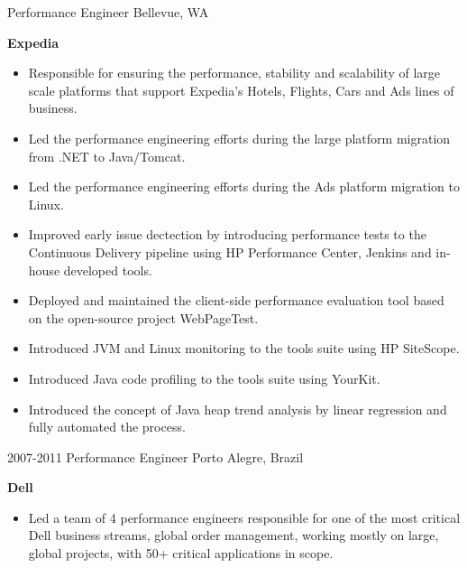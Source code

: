 \begin{entrylist}
    {Performance Engineer}
    {Bellevue, WA}
    {
      \textbf{Expedia}
      \begin{itemize}
        \item Responsible for ensuring the performance, stability and scalability of large scale platforms that support Expedia's Hotels, Flights, Cars and Ads lines of business.
        \item Led the performance engineering efforts during the large platform migration from .NET to Java/Tomcat.
        \item Led the performance engineering efforts during the Ads platform migration to Linux.
        \item Improved early issue dectection by introducing performance tests to the Continuous Delivery pipeline using HP Performance Center, Jenkins and in-house developed tools.
        \item Deployed and maintained the client-side performance evaluation tool based on the open-source project WebPageTest.
        \item Introduced JVM and Linux monitoring to the tools suite using HP SiteScope.
        \item Introduced Java code profiling to the tools suite using YourKit.
        \item Introduced the concept of Java heap trend analysis by linear regression and fully automated the process.
      \end{itemize}
    }
  \entry
    {2007-2011}
    {Performance Engineer}
    {Porto Alegre, Brazil}
    {
      \textbf{Dell}
      \begin{itemize}
        \item Led a team of 4 performance engineers responsible for one of the most critical Dell business streams, global order management, working mostly on large, global projects, with 50+ critical applications in scope.

\end{itemize}}
\end{entrylist}
